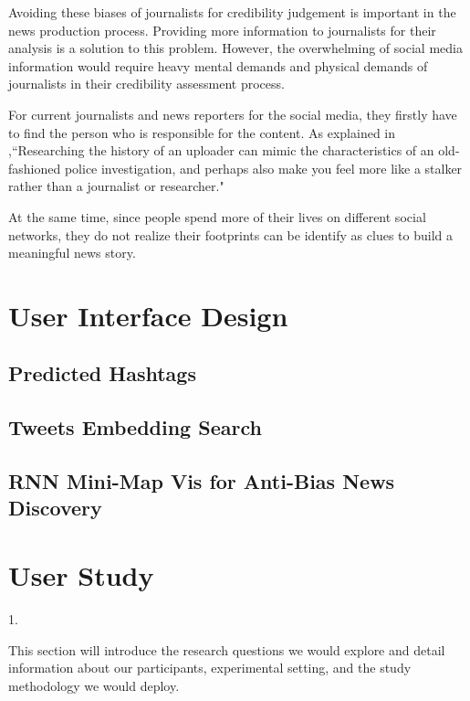 Avoiding these biases of journalists for credibility judgement is important in the news production process. Providing more information to journalists for their analysis is a solution to this problem. However, the overwhelming of social media information would require heavy mental demands and physical demands of journalists in their credibility assessment process. 

For current journalists and news reporters for the social media, they firstly have to find the person who is responsible for the content. As explained in \cite{Silverman2014} ,``Researching the history of an uploader can mimic the characteristics of an old-fashioned police investigation, and perhaps also make you feel more like a stalker rather than a journalist or researcher." 

At the same time, since people spend more of their lives on different social networks, they do not realize their footprints can be identify as clues to build a meaningful news story.





\section{User Interface Design}


\subsection{Predicted Hashtags}


\subsection{Tweets Embedding Search}


\subsection{RNN Mini-Map Vis for Anti-Bias News Discovery}




\section{User Study}


1. 

This section will introduce the research questions we would explore and detail information about our participants, experimental setting, and the study methodology we would deploy. 

